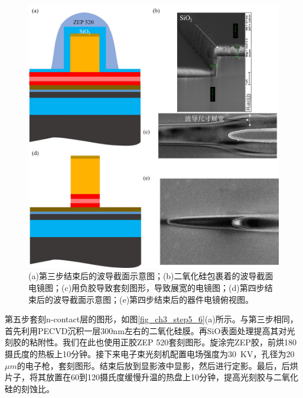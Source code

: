 \begin{figure}[htb]
	\centering
	\includegraphics[width=14cm]{./Pictures/fig_ch3_step3_4.jpg}
	\caption{(a)第三步结束后的波导截面示意图；(b)二氧化硅包裹着的波导截面电镜图；(c)用负胶导致套刻图形，导致展宽的电镜图；(d)第四步结束后的波导截面示意图；(e)第四步结束后的器件电镜俯视图。}
	\label{fig_ch3_step3_4}
\end{figure}


第五步套刻n-contact层的图形，如图\ref{fig_ch3_step5_6}(a)所示。与第三步相同，首先利用PECVD沉积一层300nm左右的二氧化硅膜。再SiO表面处理提高其对光刻胶的粘附性。我们在此也使用正胶ZEP 520套刻图形。旋涂完ZEP胶，前烘180摄氏度的热板上10分钟。接下来电子束光刻机配置电场强度为30~KV，孔径为20~$\mu m$的电子枪，套刻图形。结束后放到显影液中显影，然后进行定影。最后，后烘片子，将其放置在60到120摄氏度缓慢升温的热盘上10分钟，提高光刻胶与二氧化硅的刻蚀比。

